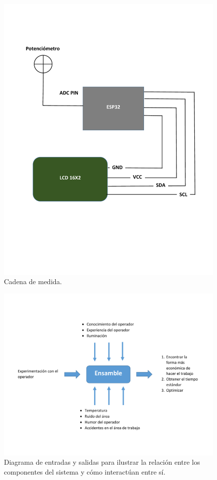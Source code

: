     \begin{figure}[H]
        \centering
        \includegraphics[trim = {15mm 15mm 15mm 15mm},clip,scale=0.35]{3/Img/cadenaDeMedida.pdf}
        \caption{Cadena de medida.}
        \label{fig:cadena de medida}
    \end{figure}
    \begin{figure}[H]
        \centering
        \includegraphics[trim = {15mm 0mm 0mm 0mm},clip,scale=0.35]{3/Img/diagramaDeEntradasySalidas.pdf}
        \caption{Diagrama de entradas y salidas para ilustrar la relación entre los componentes del sistema y cómo interactúan entre sí.}
        \label{fig:diagrama de entradas y salidas}
    \end{figure}
